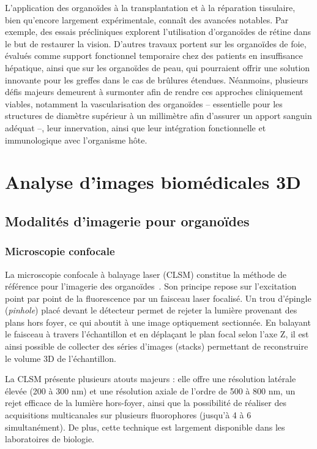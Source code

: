 L'application des organoïdes à la transplantation et à la réparation tissulaire, bien qu'encore largement expérimentale, connaît des avancées notables. Par exemple, des essais précliniques explorent l'utilisation d'organoïdes de rétine dans le but de restaurer la vision. D'autres travaux portent sur les organoïdes de foie, évalués comme support fonctionnel temporaire chez des patients en insuffisance hépatique, ainsi que sur les organoïdes de peau, qui pourraient offrir une solution innovante pour les greffes dans le cas de brûlures étendues. Néanmoins, plusieurs défis majeurs demeurent à surmonter afin de rendre ces approches cliniquement viables, notamment la vascularisation des organoïdes – essentielle pour les structures de diamètre supérieur à un millimètre afin d'assurer un apport sanguin adéquat –, leur innervation, ainsi que leur intégration fonctionnelle et immunologique avec l'organisme hôte.

\section{Analyse d'images biomédicales 3D}

\subsection{Modalités d'imagerie pour organoïdes}

\subsubsection{Microscopie confocale}

La microscopie confocale à balayage laser (CLSM) constitue la méthode de référence pour l’imagerie des organoïdes~\cite{Litjens2017}. Son principe repose sur l’excitation point par point de la fluorescence par un faisceau laser focalisé. Un trou d’épingle (\textit{pinhole}) placé devant le détecteur permet de rejeter la lumière provenant des plans hors foyer, ce qui aboutit à une image optiquement sectionnée. En balayant le faisceau à travers l’échantillon et en déplaçant le plan focal selon l’axe Z, il est ainsi possible de collecter des séries d’images (stacks) permettant de reconstruire le volume 3D de l’échantillon.

La CLSM présente plusieurs atouts majeurs : elle offre une résolution latérale élevée (200 à 300 nm) et une résolution axiale de l’ordre de 500 à 800 nm, un rejet efficace de la lumière hors-foyer, ainsi que la possibilité de réaliser des acquisitions multicanales sur plusieurs fluorophores (jusqu’à 4 à 6 simultanément). De plus, cette technique est largement disponible dans les laboratoires de biologie.

